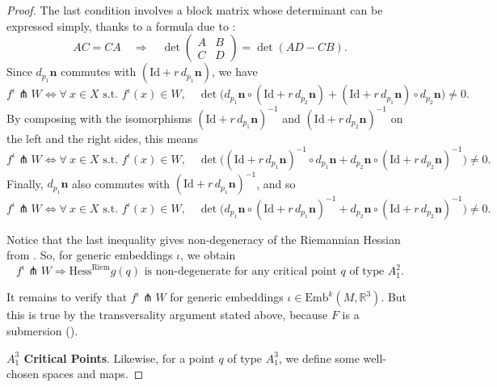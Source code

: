\documentclass[11pt]{article}
\newcommand{\R}{\mathbb{R}}
\newcommand{\io}{\iota}
\newcommand{\nbf}{\mathbf{n}}
\newcommand{\Emb}{\mathrm{Emb}^k(M,\R^3)}
\newcommand{\Hess}{\mathrm{Hess}}
\newcommand{\Id}{\mathrm{Id}}
\theoremstyle{plain}
\theoremstyle{definition}
\theoremstyle{remark}
\begin{document}
\begin{proof}
The last condition involves a block matrix whose determinant can be expressed simply, thanks to a formula due to \cite{silvester_determinants_2000}:
\[AC = CA \quad \Rightarrow \quad \det 
\begin{pmatrix}
A & B \\
C & D
\end{pmatrix} = \det(AD - CB).\]
Since $d_{p_1} \nbf$ commutes with $(\Id + r \, d_{p_1} \nbf)$, we have
\[f^\io \pitchfork W \Leftrightarrow \forall\ x \in X \text{ s.t. } f^\io(x) \in W, \quad \det \big(d_{p_1} \nbf \circ (\Id + r \, d_{p_2} \nbf) + (\Id + r \, d_{p_1} \nbf) \circ d_{p_2} \nbf \big) \neq 0.\]
By composing with the isomorphisms $(\Id + r \, d_{p_1} \nbf)^{-1}$ and $(\Id + r \, d_{p_2} \nbf)^{-1}$ on the left and the right sides, this means
\[f^\io \pitchfork W 
 \Leftrightarrow \forall\ x \in X \text{ s.t. } f^\io(x) \in W, \quad \det \big((\Id + r \, d_{p_1} \nbf)^{-1} \circ d_{p_1} \nbf +  d_{p_2} \nbf \circ (\Id + r \, d_{p_2} \nbf)^{-1} \big) \neq 0.\]
Finally, $d_{p_1} \nbf$ also commutes with $(\Id + r \, d_{p_1} \nbf)^{-1}$, and so
\[f^\io \pitchfork W \Leftrightarrow \forall\ x \in X \text{ s.t. } f^\io(x) \in W, \quad \det \big( d_{p_1} \nbf \circ (\Id + r \, d_{p_1} \nbf)^{-1} + d_{p_2} \nbf \circ (\Id + r \, d_{p_2} \nbf)^{-1} \big) \neq 0.\]


Notice that the last inequality gives non-degeneracy of the Riemannian Hessian from . So, for generic embeddings $\io$, we obtain
\[f^\io \pitchfork W \Rightarrow \Hess^\mathrm{Riem} g(q) \text{ is non-degenerate for any critical point } q \text{ of type } A_1^2. \]

It remains to verify that $f^\io \pitchfork W$ for generic embeddings $\io \in \Emb$. But this is true by the transversality argument stated above, because $F$ is a submersion ().


\textbf{$A_1^3$ Critical Points}. Likewise, for a point $q$ of type $A_1^3$, we define some well-chosen spaces and maps.


\end{proof}
\end{document}
